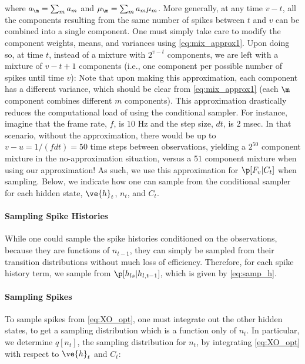 \noindent where $a_\m=\sum_m a_m$ and $\mu_{\m}=\sum_m a_{m} \mu_{m}$.  More generally, at any time $v-t$, all the components resulting from the same number of spikes between $t$ and $v$ can be combined into a single component.  One must simply take care to modify the component weights, means, and variances using \eqref{eq:mix_approx1}.  Upon doing so, at time $t$, instead of a mixture with $2^{v-t}$ components, we are left with a mixture of $v-t+1$ components (i.e., one component per possible number of spikes until time $v$):
%
%
Note that upon making this approximation, each component has a different variance, which should be clear from \eqref{eq:mix_approx1} (each $\m$ component combines different $m$ components).  This approximation drastically reduces the computational load of using the conditional sampler.  For instance, imagine that the frame rate, $f$, is $10$ Hz and the step size, $dt$, is $2$ msec.  In that scenario, without the approximation, there would be up to $v-u=1/(f dt)=50$ time steps between observations, yielding a $2^{50}$ component mixture in the no-approximation situation, versus a $51$ component mixture when using our approximation!  As such, we use this approximation for $\p[F_v | C_t]$ when sampling.  Below, we indicate how one can sample from the conditional sampler for each hidden state, $\ve{h}_t$, $n_t$, and $C_t$.

\paragraph{Sampling Spike Histories}

While one could sample the spike histories conditioned on the observations, because they are functions of $n_{t-1}$, they can simply be sampled from their transition distributions without much loss of efficiency.  Therefore, for each spike history term, we sample from $\p[h_{ls} | h_{l,t-1}]$, which is given by \eqref{eq:samp_h}.

\paragraph{Sampling Spikes}

To sample spikes from \eqref{eq:XO_opt}, one must integrate out the other hidden states, to get a sampling distribution which is a function only of $n_t$.  In particular, we determine $q[n_t]$, the sampling distribution for $n_t$, by integrating \eqref{eq:XO_opt} with respect to $\ve{h}_t$ and $C_t$:

